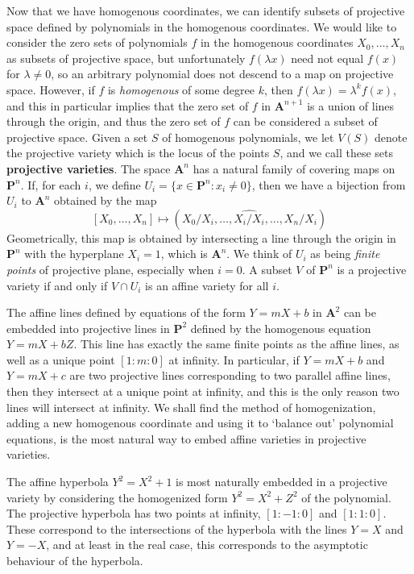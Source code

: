 Now that we have homogenous coordinates, we can identify subsets of projective space defined by polynomials in the homogenous coordinates. We would like to consider the zero sets of polynomials $f$ in the homogenous coordinates $X_0, \dots, X_n$ as subsets of projective space, but unfortunately $f(\lambda x)$ need not equal $f(x)$ for $\lambda \neq 0$, so an arbitrary polynomial does not descend to a map on projective space. However, if $f$ is {\it homogenous} of some degree $k$, then $f(\lambda x) = \lambda^k f(x)$, and this in particular implies that the zero set of $f$ in $\mathbf{A}^{n+1}$ is a union of lines through the origin, and thus the zero set of $f$ can be considered a subset of projective space. Given a set $S$ of homogenous polynomials, we let $V(S)$ denote the projective variety which is the locus of the points $S$, and we call these sets {\bf projective varieties}. The space $\mathbf{A}^n$ has a natural family of covering maps on $\mathbf{P}^n$. If, for each $i$, we define $U_i = \{ x \in \mathbf{P}^n: x_i \neq 0 \}$, then we have a bijection from $U_i$ to $\mathbf{A}^n$ obtained by the map
%
\[ [X_0, \dots, X_n] \mapsto (X_0/X_i, \dots, \widehat{X_i/X_i} ,\dots, X_n/X_i) \]
%
Geometrically, this map is obtained by intersecting a line through the origin in $\mathbf{P}^n$ with the hyperplane $X_i = 1$, which is $\mathbf{A}^n$. We think of $U_i$ as being {\it finite points} of projective plane, especially when $i = 0$. A subset $V$ of $\mathbf{P}^n$ is a projective variety if and only if $V \cap U_i$ is an affine variety for all $i$.

\begin{example}
    The affine lines defined by equations of the form $Y = mX + b$ in $\mathbf{A}^2$ can be embedded into projective lines in $\mathbf{P}^2$ defined by the homogenous equation $Y = mX + bZ$. This line has exactly the same finite points as the affine lines, as well as a unique point $[1:m:0]$ at infinity. In particular, if $Y = mX + b$ and $Y = mX + c$ are two projective lines corresponding to two parallel affine lines, then they intersect at a unique point at infinity, and this is the only reason two lines will intersect at infinity. We shall find the method of homogenization, adding a new homogenous coordinate and using it to `balance out' polynomial equations, is the most natural way to embed affine varieties in projective varieties.
\end{example}

\begin{example}
    The affine hyperbola $Y^2 = X^2 + 1$ is most naturally embedded in a projective variety by considering the homogenized form $Y^2 = X^2 + Z^2$ of the polynomial. The projective hyperbola has two points at infinity, $[1:-1:0]$ and $[1:1:0]$. These correspond to the intersections of the hyperbola with the lines $Y = X$ and $Y = -X$, and at least in the real case, this corresponds to the asymptotic behaviour of the hyperbola.
\end{example}

